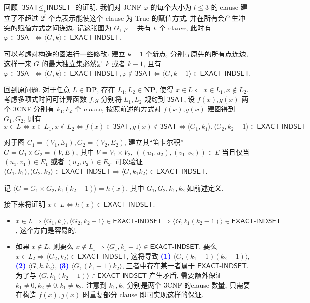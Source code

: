 \documentclass[8pt]{article}
\theoremstyle{compact}
\def\obj#1{\textbf{\uline{#1}}}
\def\num#1{\textnormal{\textbf{\mbox{\textcolor{blue}{(#1)}}}}}
\def\le{\leqslant}
\begin{document}
\subsection{}
回顾 $\textsf{3SAT} \le_p \textsf{INDSET}$ 的证明, 我们对 3CNF $\varphi$ 的每个大小为 $l \le 3$ 的 clause 建立了不超过 $2^l$ 个点表示能使这个 clause 为 True 的赋值方式, 并在所有会产生冲突的赋值方式之间连边. 记这张图为 $G$, $\varphi$ 一共有 $k$ 个 clause, 此时有 $\varphi \in \textsf{3SAT} \Leftrightarrow \langle G, k \rangle \in \textsf{EXACT-INDSET}$.

可以考虑对构造的图进行一些修改: 建立 $k - 1$ 个新点, 分别与原先的所有点连边, 这样一来 $G$ 的最大独立集必然是 $k$ 或者 $k - 1$, 且有 $\varphi \in \textsf{3SAT} \Leftrightarrow \langle G, k \rangle \in \textsf{EXACT-INDSET}, \varphi \notin \textsf{3SAT} \Leftrightarrow \langle G, k - 1 \rangle \in \textsf{EXACT-INDSET}$.

回到原问题. 对于任意 $L \in \textbf{DP}$, 存在 $L_1, L_2 \in \textbf{NP}$, 使得 $x \in L \Leftarrow x \in L_1, x \notin L_2$. 考虑多项式时间可计算函数 $f, g$ 分别将 $L_1, L_2$ 规约到 $\textsf{3SAT}$, 设 $f(x), g(x)$ 两个 3CNF 分别有 $k_1, k_2$ 个 clause, 按照前述的方式对 $f(x), g(x)$ 建图得到 $G_1, G_2$, 则有
$$x \in L \Leftrightarrow x \in L_1, x \notin L_2 \Leftrightarrow f(x) \in \textsf{3SAT}, g(x) \notin \textsf{3SAT} \Leftrightarrow \langle G_1, k_1 \rangle, \langle G_2, k_2 - 1 \rangle \in \textsf{EXACT-INDSET}$$

对于图 $G_1 = (V_1, E_1), G_2 = (V_2, E_2)$, 建立其“笛卡尔积”$G = G_1 \times G_2 =  (V, E)$, 其中 $V = V_1 \times V_2$, $((u_1, u_2), (v_1, v_2)) \in E$ 当且仅当 $(u_1, v_1) \in E_1$ \obj{或者} $(u_2, v_2) \in E_2$. 可以验证 $\langle G_1, k_1 \rangle, \langle G_2, k_2 \rangle \in \textsf{EXACT-INDSET} \Rightarrow \langle G, k_1k_2 \rangle \in \textsf{EXACT-INDSET}$. 

记 $\langle G = G_1 \times G_2, k_1(k_2 - 1) \rangle = h(x)$, 其中 $G_1, G_2, k_1, k_2$ 如前述定义.

接下来将证明 $x \in L \Leftrightarrow h(x) \in \textsf{EXACT-INDSET}$.
\begin{itemize}
	\item $x \in L \Rightarrow \langle G_1, k_1 \rangle, \langle G_2, k_2 - 1 \rangle \in \textsf{EXACT-INDSET} \Rightarrow \langle G, k_1(k_2-1) \rangle \in \textsf{EXACT-INDSET}$, 这个方向是容易的.
	\item 如果 $x \notin L$, 则要么 $x \notin L_1 \Rightarrow \langle G_1, k_1-1 \rangle \in \textsf{EXACT-INDSET}$, 要么 $x \in L_2 \Rightarrow \langle G_2, k_2 \rangle \in \textsf{EXACT-INDSET}$, 这将导致 \num{1} $\langle G, (k_1 - 1)(k_2 - 1) \rangle$, \num{2} $\langle G, k_1k_2 \rangle$, \num{3} $\langle G, (k_1 - 1)k_2 \rangle$, 三者中存在某一者属于 $\textsf{EXACT-INDSET}$. 为了与 $\langle G, k_1(k_2 - 1) \rangle \in \textsf{EXACT-INDSET}$ 产生矛盾, 需要额外保证 $k_1 \neq 0, k_2 \neq 0, k_1 \neq k_2$, 注意到 $k_1, k_2$ 分别是两个 3CNF 的clause 数量, 只需要在构造 $f(x), g(x)$ 时重复部分 clause 即可实现这样的保证.
\end{itemize}
\end{document}
